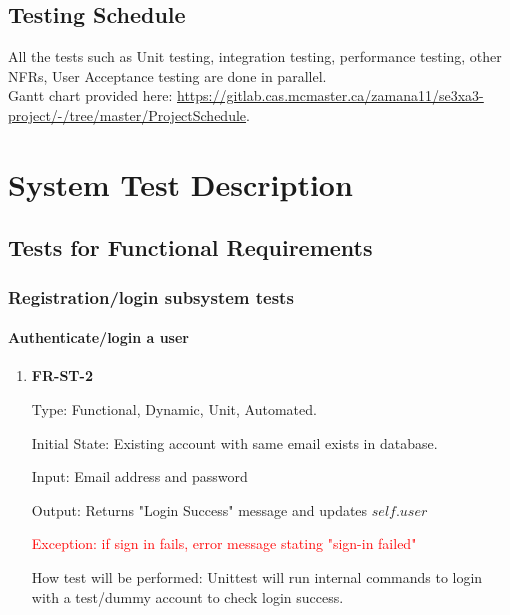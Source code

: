\documentclass[12pt, titlepage]{article}
\begin{document}
\subsection{Testing Schedule}
All the tests such as  Unit testing, integration testing, performance testing, other NFRs, User Acceptance testing are done in parallel.\\

Gantt chart provided here: \href{https://gitlab.cas.mcmaster.ca/zamana11/se3xa3-project/-/tree/master/ProjectSchedule)}{https://gitlab.cas.mcmaster.ca/zamana11/se3xa3-project/-/tree/master/ProjectSchedule}.

\section{System Test Description}
	
\subsection{Tests for Functional Requirements}
\subsubsection{Registration/login subsystem tests}
		
\paragraph{Authenticate/login a user}

\begin{enumerate}

\item{\textbf{FR-ST-2}}

Type: Functional, Dynamic, Unit, Automated.
					
Initial State: Existing account with same email exists in database.
					
Input: Email address and password
					
Output: Returns "Login Success" message and updates $self.user$

\textcolor{red}{Exception: if sign in fails, error message stating "sign-in failed"}
					
How test will be performed: Unittest will run internal commands to login with a test/dummy account to check login success.
\end{enumerate}
\end{document}
